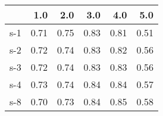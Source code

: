 \begin{tabular}{lrrrrr}
\toprule
{} &  1.0 &  2.0 &  3.0 &  4.0 &  5.0 \\
\midrule
s-1 & 0.71 & 0.75 & 0.83 & 0.81 & 0.51 \\
s-2 & 0.72 & 0.74 & 0.83 & 0.82 & 0.56 \\
s-3 & 0.72 & 0.74 & 0.83 & 0.83 & 0.56 \\
s-4 & 0.73 & 0.74 & 0.84 & 0.84 & 0.57 \\
s-8 & 0.70 & 0.73 & 0.84 & 0.85 & 0.58 \\
\bottomrule
\end{tabular}
